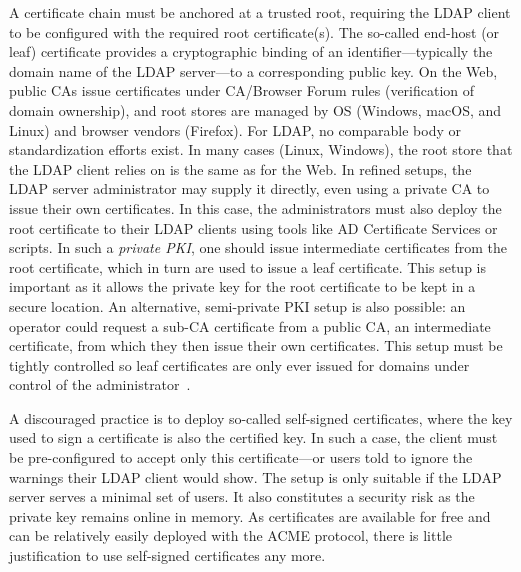 A certificate chain must be anchored at a trusted root, requiring the \gls{LDAP} client to be configured with the required root certificate(s). The so-called end-host (or leaf) certificate provides a cryptographic binding of an identifier---typically the domain name of the \gls{LDAP} server---to a corresponding public key.
On the Web, public \glspl{CA} issue certificates under CA/Browser Forum rules (\eg verification of domain ownership), and root stores are managed by OS (\eg Windows, macOS, and Linux) and browser vendors (\eg Firefox).
For \gls{LDAP}, no comparable body or standardization efforts exist. In many cases (\eg Linux, Windows), the root store that the \gls{LDAP} client relies on is the same as for the Web. In refined setups, the \gls{LDAP} server administrator may supply it directly, even using a private \gls{CA} to issue their own certificates. In this case, the administrators must also deploy the root certificate to their \gls{LDAP} clients using tools like \gls{AD} Certificate Services or scripts. In such a \textit{private PKI}, one should issue intermediate certificates from the root certificate, which in turn are used to issue a leaf certificate. This setup is important as it allows the private key for the root certificate to be kept in a secure location. An alternative, semi-private PKI setup is also possible: an operator could request a sub-CA certificate from a public CA, \ie an intermediate certificate, from which they then issue their own certificates. This setup must be tightly controlled so leaf certificates are only ever issued for domains under control of the administrator~\cite{cabr}.

A discouraged practice is to deploy so-called self-signed certificates, where the key used to sign a certificate is also the certified key. In such a case, the client must be pre-configured to accept only this certificate---or users told to ignore the warnings their \gls{LDAP} client would show. The setup is only suitable if the \gls{LDAP} server serves a minimal set of users. It also constitutes a security risk as the private key remains online in memory.  As certificates are available for free and can be relatively easily deployed with the ACME protocol, there is little justification to use self-signed certificates any more.


